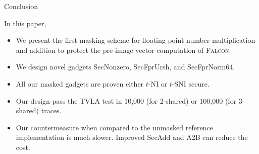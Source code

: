 \begin{frame}{Conclusion}

In this paper,
\pause
\begin{itemize}
	\item We present the first masking scheme for floating-point number multiplication and addition to protect the pre-image vector computation of \textsc{Falcon}.
	\pause
	\item We design novel gadgets {\sf SecNonzero}, {\sf SecFprUrsh}, and {\sf SecFprNorm64}.
	\pause
	\item All our masked gadgets are proven either $t$-NI or $t$-SNI secure.
	\pause
	\item Our design pass the TVLA test in 10,000 (for 2-shared) or 100,000 (for 3-shared) traces.
	\pause
	\item Our countermeasure when compared to the unmasked reference implementation is much slower. Improved {\sf SecAdd} and {\sf A2B} can reduce the cost.
\end{itemize}


\end{frame}
